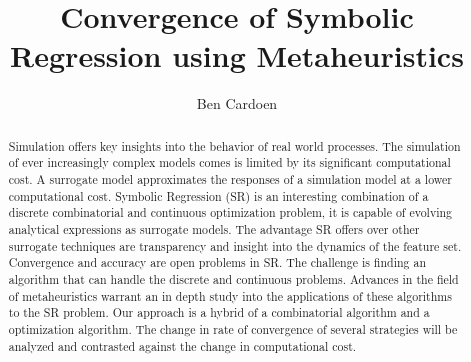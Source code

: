 \documentclass[]{article}
\title{Convergence of Symbolic Regression using Metaheuristics}
\author{Ben Cardoen}
\begin{document}
\maketitle

\begin{abstract}
Simulation offers key insights into the behavior of real world processes. The simulation of ever increasingly complex models comes is limited by its significant computational cost.
A surrogate model approximates the responses of a simulation model at a lower computational cost. 
Symbolic Regression (SR) is an interesting combination of a discrete combinatorial and continuous optimization problem, it is capable of evolving analytical expressions as surrogate models. 
The advantage SR offers over other surrogate techniques are transparency and insight into the dynamics of the feature set. %
Convergence and accuracy are open problems in SR. The challenge is finding an algorithm that can handle the discrete and continuous problems.
Advances in the field of metaheuristics warrant an in depth study into the applications of these algorithms to the SR problem. 
Our approach is a hybrid of a combinatorial algorithm and a optimization algorithm.
The change in rate of convergence of several strategies will be analyzed and contrasted against the change in computational cost.
\end{abstract}
\end{document}
